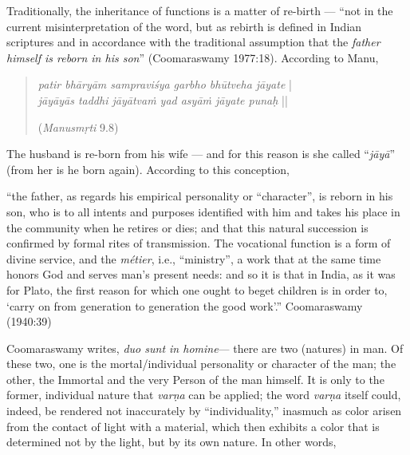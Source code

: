 Traditionally, the inheritance of functions is a matter of re-birth --- “not in the current misinterpretation of the word, but as rebirth is defined in Indian scriptures and in accordance with the traditional assumption that the {\sl father himself is reborn in his son}” (Coomaraswamy 1977:18). According to Manu,\\[-20pt] 
\begin{quote}
{{\sl patir bhāryām sampraviśya garbho bhūtveha jāyate}} |\\
{\sl jāyāyās taddhi jāyātvaṁ yad asyāṁ jāyate punaḥ} || 

\hfill ({\sl Manusmṛti} 9.8) 
\end{quote}

The husband is re-born from his wife --- and for this reason is she called “{\sl jāyā}” (from her is he born again). According to this conception, 

\begin{myquote}
“the father, as regards his empirical personality or “character”, is reborn in his son, who is to all intents and purposes identified with him and takes his place in the community when he retires or dies; and that this natural succession is confirmed by formal rites of transmission. The vocational function is a form of divine service, and the {\sl métier}, i.e., “ministry”, a work that at the same time honors God and serves man’s present needs: and so it is that in India, as it was for Plato, the first reason for which one ought to beget children is in order to, ‘carry on from generation to generation the good work’.”
\hfill Coomaraswamy (1940:39)
\end{myquote}

Coomaraswamy writes,  {\sl duo sunt in homine}--- there are two (natures) in man. Of these two, one is the mortal/individual personality or character of the man; the other, the Immortal and the very Person of the man himself. It is only to the former, individual nature that {\sl varṇa} can be applied; the word {\sl varṇa} itself could, indeed, be rendered not inaccurately by “individuality,” inasmuch as color arisen from the contact of light with a material, which then exhibits a color that is determined not by the light, but by its own nature. In other words, 

